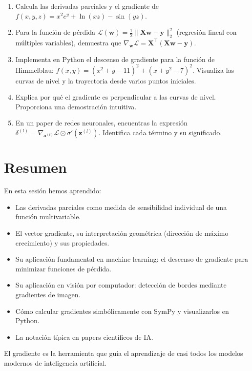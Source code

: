 \documentclass[12pt,a4paper,openany,oneside]{book}
\begin{document}
\begin{enumerate}
    \item Calcula las derivadas parciales y el gradiente de $f(x,y,z) = x^2 e^{y} + \ln(xz) - \sin(yz)$.
    \item Para la función de pérdida $\mathcal{L}(\mathbf{w}) = \frac{1}{2} \| \mathbf{X}\mathbf{w} - \mathbf{y} \|_2^2$ (regresión lineal con múltiples variables), demuestra que $\nabla_{\mathbf{w}} \mathcal{L} = \mathbf{X}^\top(\mathbf{X}\mathbf{w} - \mathbf{y})$.
    \item Implementa en Python el descenso de gradiente para la función de Himmelblau: $f(x,y) = (x^2 + y - 11)^2 + (x + y^2 - 7)^2$. Visualiza las curvas de nivel y la trayectoria desde varios puntos iniciales.
    \item Explica por qué el gradiente es perpendicular a las curvas de nivel. Proporciona una demostración intuitiva.
    \item En un paper de redes neuronales, encuentras la expresión $\delta^{(l)} = \nabla_{\mathbf{a}^{(l)}} \mathcal{L} \odot \sigma'(\mathbf{z}^{(l)})$. Identifica cada término y su significado.
\end{enumerate}

\section{Resumen}

En esta sesión hemos aprendido:
\begin{itemize}
    \item Las derivadas parciales como medida de sensibilidad individual de una función multivariable.
    \item El vector gradiente, su interpretación geométrica (dirección de máximo crecimiento) y sus propiedades.
    \item Su aplicación fundamental en machine learning: el descenso de gradiente para minimizar funciones de pérdida.
    \item Su aplicación en visión por computador: detección de bordes mediante gradientes de imagen.
    \item Cómo calcular gradientes simbólicamente con SymPy y visualizarlos en Python.
    \item La notación típica en papers científicos de IA.
\end{itemize}
El gradiente es la herramienta que guía el aprendizaje de casi todos los modelos modernos de inteligencia artificial.
\end{document}
